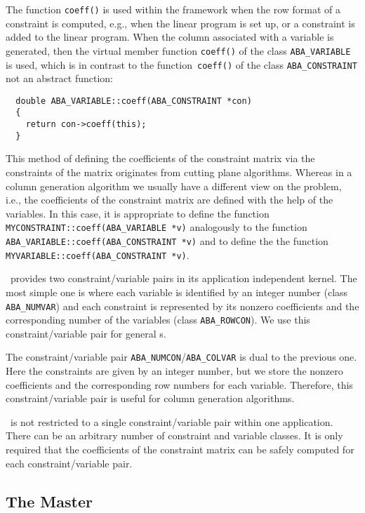 The function {\tt coeff()} is used within the framework when the row
format of a constraint is computed, e.g., when the linear program
is set up, or a constraint is added to the linear program.
When the column associated with a variable is generated, then the virtual
member function {\tt coeff()} of the class {\tt ABA\_VARIABLE} is used, which
is in contrast to the function~{\tt coeff()} of the class {\tt ABA\_CONSTRAINT}
not an abstract function:
\begin{verbatim}
  double ABA_VARIABLE::coeff(ABA_CONSTRAINT *con)
  {
    return con->coeff(this);
  }
\end{verbatim}
This method of defining the coefficients of the constraint matrix via
the constraints of the matrix originates from cutting plane algorithms.
Whereas in a column generation algorithm we usually have a different view on the 
problem, i.e., the coefficients of the constraint matrix are defined
with the help of the variables. In this case, it is appropriate to define
the function {\tt MYCONSTRAINT::coeff(ABA\_VARIABLE *v)} analogously to the function 
{\tt ABA\_VARIABLE::coeff(ABA\_CONSTRAINT *v)} and to define the the function
{\tt MYVARIABLE::coeff(ABA\_CONSTRAINT *v)}.


\ABACUS\ provides two constraint/variable pairs in its application independent
kernel.
The most simple one is where each variable is identified by
an integer number (class {\tt ABA\_NUMVAR}) and each 
constraint is represented
by its nonzero coefficients and the corresponding number of the variables
(class {\tt ABA\_ROWCON}). We use this constraint/variable pair
for general \mip s.

The constraint/variable pair 
{\tt ABA\_NUMCON}/{\tt ABA\_COLVAR} is dual to the previous
one. Here the constraints are given by an integer number, but we store
the nonzero coefficients and the corresponding row numbers for each variable.
Therefore, this constraint/variable pair is useful for column generation algorithms.

\ABACUS\ is not restricted to a single constraint/variable pair within
one application. There can be an arbitrary number of constraint and variable
classes. It is only required that the coefficients of the constraint
matrix can be safely computed for each constraint/variable pair.

\subsection{The Master}

